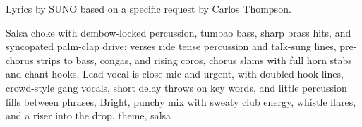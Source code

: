 
\begin{notes}
Lyrics by SUNO based on a specific request by Carlos Thompson.
\end{notes}
\begin{style}
Salsa choke with dembow-locked percussion, tumbao bass, sharp brass hits, and syncopated palm-clap drive; verses ride tense percussion and talk-sung lines, pre-chorus strips to bass, congas, and rising coros, chorus slams with full horn stabs and chant hooks, Lead vocal is close-mic and urgent, with doubled hook lines, crowd-style gang vocals, short delay throws on key words, and little percussion fills between phrases, Bright, punchy mix with sweaty club energy, whistle flares, and a riser into the drop, theme, salsa
\end{style}
